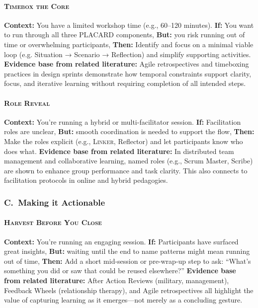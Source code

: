 \documentclass[acmlarge,timestamp]{acmart}
\begin{document}
{\paragraph*{{\scshape Timebox the Core}}

\noindent \textbf{Context:} You have a limited workshop time (e.g., 60–120 minutes).
\textbf{If:} You want to run through all three PLACARD components,  \textbf{But:} you risk running out of time or overwhelming participants,
\textbf{Then:} Identify and focus on a minimal viable loop (e.g. Situation → Scenario → Reflection) and simplify supporting activities.
\textbf{Evidence base from related literature:} Agile retrospectives and timeboxing practices in design sprints demonstrate how temporal constraints support clarity, focus, and iterative learning without requiring completion of all intended steps.

\paragraph*{{\scshape Role Reveal}}

\noindent \textbf{Context:} You’re running a hybrid or multi-facilitator session.
\textbf{If:} Facilitation roles are unclear,  \textbf{But:} smooth coordination is needed to support the flow,
\textbf{Then:} Make the roles explicit (e.g., {\scshape Linker}, {\sc Reflector}) and let participants know who does what.
\textbf{Evidence base from related literature:} In distributed team management and collaborative learning, named roles (e.g., Scrum Master, Scribe) are shown to enhance group performance and task clarity. This also connects to facilitation protocols in online and hybrid pedagogies.

\subsubsection*{C.~Making it Actionable}

\paragraph*{{\scshape Harvest Before You Close}}

\noindent \textbf{Context:} You’re running an engaging session.
\textbf{If:} Participants have surfaced great insights,  \textbf{But:} waiting until the end to name patterns might mean running out of time,
\textbf{Then:} Add a short mid-session or pre-wrap-up step to ask: “What’s something you did or saw that could be reused elsewhere?”
\textbf{Evidence base from related literature:} After Action Reviews (military, management), Feedback Wheels (relationship therapy), and Agile retrospectives all highlight the value of capturing learning as it emerges—not merely as a concluding gesture.

}
\end{document}
